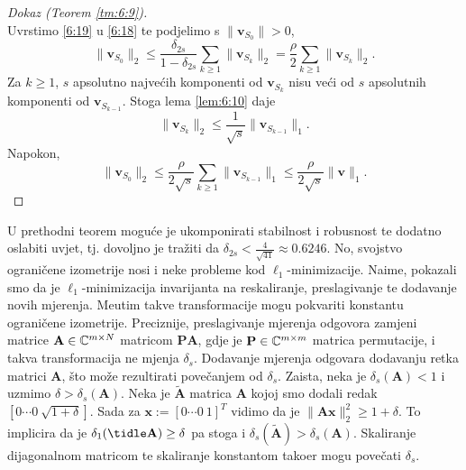 \documentclass[a4paper,twoside,12pt]{memoir} %
\newcommand{\vect}[1]{\mathbf{#1}}
\renewcommand{\vec}{\vect}
\newcommand{\norm}[1]{\|{#1}\|}
\begin{document}
\begin{proof}[Dokaz (Teorem \ref{tm:6:9})]
\begin{equation}
    \end{equation}
    Uvrstimo \eqref{6:19} u \eqref{6:18} te podjelimo s $\norm{\vec v_{S_0}} > 0$, 
    \begin{equation*}
        \norm{\vec v_{S_0}}_2 \leq \frac{\delta_{2s}}{1 - \delta_{2s}} \sum_{k \geq 1} \norm{\vec v_{S_k}}_2 = \frac{\rho}{2} \sum_{k \geq 1} \norm{\vec v_{S_k}}_2.
    \end{equation*}
    Za $k \geq 1$, $s$ apsolutno najve\'cih komponenti od $\vec v_{S_k}$ nisu ve\'ci od $s$ apsolutnih komponenti od $\vec v_{S_{k-1}}$. Stoga lema \ref{lem:6:10} daje
    \begin{equation*}
        \norm{\vec v_{S_k}}_2 \leq \frac{1}{\sqrt{s}} \norm{\vec v_{S_{k-1}}}_1.
    \end{equation*}
    Napokon, 
    \begin{equation*}
        \norm{\vec v_{S_0}}_2 \leq \frac{\rho}{2 \sqrt{s}} \sum_{k \geq 1} \norm{\vec v_{S_{k-1}}}_1 \leq \frac{\rho}{2 \sqrt{s}} \norm{\vec v}_1. 
    \end{equation*}
\end{proof}

U prethodni teorem mogu\'ce je ukomponirati stabilnost i robusnost te dodatno oslabiti uvjet, tj. dovoljno  je tra\v{z}iti da $\delta_{2s} < \frac{4}{\sqrt{41}} \approx 0.6246$. No, svojstvo ograni\v{c}ene izometrije nosi i neke probleme kod $\ell_1$-minimizacije. Naime, pokazali smo da je $\ell_1$-minimizacija invarijanta na reskaliranje, preslagivanje te dodavanje novih mjerenja. Me\dj utim takve transformacije mogu pokvariti konstantu ograni\v{c}ene izometrije. Preciznije, preslagivanje mjerenja odgovora zamjeni matrice $\vec A \in \C^{m \times N}$ matricom $\vec{PA}$, gdje je $\vec P \in \C^{m \times m}$ matrica permutacije, i takva transformacija ne mjenja $\delta_s$. Dodavanje mjerenja odgovara dodavanju retka matrici $\vec A$, \v{s}to mo\v{z}e rezultirati pove\v{c}anjem od $\delta_s$. Zaista, neka je $\delta_s(\vec A) < 1$ i uzmimo $\delta > \delta_s(\vec A)$. Neka je $\vec{\tilde A}$ matrica $\vec A$ kojoj smo dodali redak $[0 \cdots 0\ \sqrt{1+\delta}]$. Sada za $\vec x := [0 \cdots 0\ 1]^T$ vidimo da je $\norm{\vec{Ax}}^2_2 \geq 1+\delta$. To implicira da je $\delta_1(\vec{\tidle A}) \geq \delta$ pa stoga i $\delta_s(\vec{\tilde A}) > \delta_s(\vec A)$. Skaliranje dijagonalnom matricom te skaliranje konstantom tako\dj er mogu pove\v{c}ati $\delta_s$.
\end{document}
